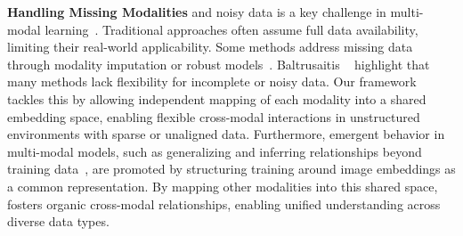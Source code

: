 \noindent \textbf{Handling Missing Modalities} and noisy data is a key challenge in multi-modal learning~\cite{baltruvsaitis2018multimodal}. Traditional approaches often assume full data availability, limiting their real-world applicability. Some methods address missing data through modality imputation or robust models~\cite{tsai2018learning,wu2024comprehensive}. Baltrusaitis \etal~\cite{baltruvsaitis2018multimodal} highlight that many methods lack flexibility for incomplete or noisy data. Our framework tackles this by allowing independent mapping of each modality into a shared embedding space, enabling flexible cross-modal interactions in unstructured environments with sparse or unaligned data. Furthermore, emergent behavior in multi-modal models, such as generalizing and inferring relationships beyond training data~\cite{Radford2021LearningTV,girdhar2023imagebind}, are promoted by structuring training around image embeddings as a common representation. By mapping other modalities into this shared space, \project{} fosters organic cross-modal relationships, enabling unified understanding across diverse data types. 